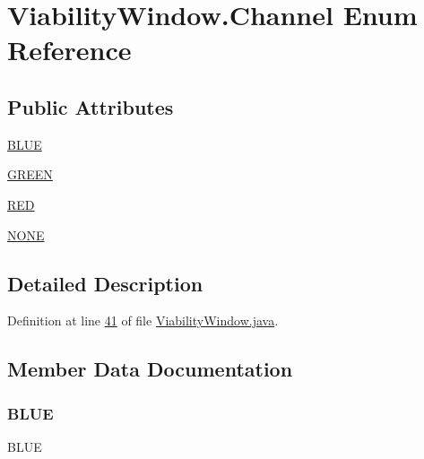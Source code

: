 \hypertarget{enumgui_1_1_viability_window_1_1_channel}{}\section{Viability\+Window.\+Channel Enum Reference}
\label{enumgui_1_1_viability_window_1_1_channel}
\subsection*{Public Attributes}
\begin{DoxyCompactItemize}
\item 
\hyperlink{enumgui_1_1_viability_window_1_1_channel_a6b317f511e4605122591a00ca0fb1659}{B\+L\+UE}
\item 
\hyperlink{enumgui_1_1_viability_window_1_1_channel_ae64c262ce1094f21457d2f78dd45a8fc}{G\+R\+E\+EN}
\item 
\hyperlink{enumgui_1_1_viability_window_1_1_channel_a2fa22bc5317cd6f6690f2528eaf84400}{R\+ED}
\item 
\hyperlink{enumgui_1_1_viability_window_1_1_channel_a899caa602e4fff675b17cdbab33607ec}{N\+O\+NE}
\end{DoxyCompactItemize}


\subsection{Detailed Description}


Definition at line \hyperlink{_viability_window_8java_source_l00041}{41} of file \hyperlink{_viability_window_8java_source}{Viability\+Window.\+java}.



\subsection{Member Data Documentation}
\hypertarget{enumgui_1_1_viability_window_1_1_channel_a6b317f511e4605122591a00ca0fb1659}{}\label{enumgui_1_1_viability_window_1_1_channel_a6b317f511e4605122591a00ca0fb1659} 
\subsubsection{\texorpdfstring{B\+L\+UE}{BLUE}}
{\footnotesize\ttfamily B\+L\+UE}



